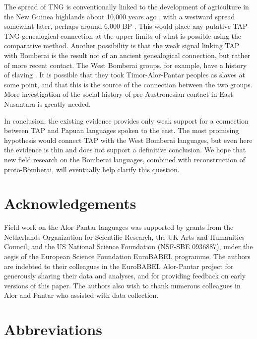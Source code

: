 The spread of TNG is conventionally linked to the development of agriculture in the New Guinea highlands about 10,000 years ago \citep{Bellwood2001}, with a westward spread somewhat later, perhaps around 6,000 BP \citep{Pawley1998}. This would place any putative TAP-TNG genealogical connection at the upper limits of what is possible using the comparative method. Another possibility is that the weak signal linking TAP with Bomberai is the result not of an ancient genealogical connection, but rather of more recent contact. The West Bomberai groups, for example, have a history of slaving \citep[109]{KlamerEtAl2008}. It is possible that they took Timor-Alor-Pantar peoples as slaves at some point, and that this is the source of the connection between the two groups. More investigation of the social history of pre-Austronesian contact in East Nusantara is greatly needed.

In conclusion, the existing evidence provides only weak support for a connection between TAP and Papuan languages spoken to the east. The most promising hypothesis would connect TAP with the West Bomberai languages, but even here the evidence is thin and does not support a definitive conclusion. We hope that new field research on the Bomberai languages, combined with reconstruction of proto-Bomberai, will eventually help clarify this question.

\section*{Acknowledgements}

Field work on the Alor-Pantar languages was supported by grants from the Netherlands Organization for Scientific Research, the UK Arts and Humanities Council, and the US National Science Foundation (NSF-SBE 0936887), under the aegis of the European Science Foundation EuroBABEL programme. The authors are indebted to their colleagues in the \mbox{EuroBABEL} Alor-Pantar project for generously sharing their data and analyses, and for providing feedback on early versions of this paper. The authors also wish to thank numerous colleagues in Alor and Pantar who assisted with data collection.

\section*{Abbreviations}


